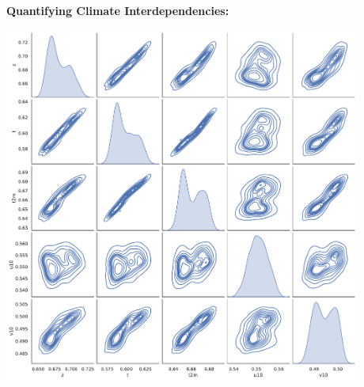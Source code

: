 \documentclass[landscape,a1paper,fontscale=0.424]{baposter}
\begin{document}
\begin{poster}
{\begin{minipage}[t]{0.50\textwidth}
            \textbf{\color{blue}Quantifying Climate Interdependencies:}
            \vspace{-0.5em}
            \begin{center}
                \includegraphics[width=0.88\textwidth]{pairwise.pdf}
            \end{center}
        \end{minipage}

}
\end{poster}
\end{document}

